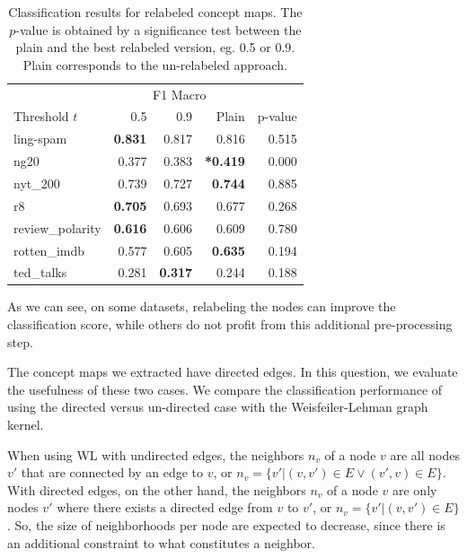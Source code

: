 \begin{table}[htb!]
	\centering
	\begin{tabular}{lrrrr}
		{} & \multicolumn{3}{c}{F1 Macro} &  \\
		Threshold $t$ &         0.5 &   0.9 & Plain & p-value \\
		\midrule
		ling-spam       & \textbf{0.831} & 0.817 & 0.816 & 0.515 \\
		ng20            & 0.377 & 0.383 & \textbf{*0.419} & 0.000 \\
		nyt\_200         & 0.739 & 0.727 & \textbf{0.744} & 0.885 \\
		r8              & \textbf{0.705} & 0.693 & 0.677 & 0.268 \\
		review\_polarity & \textbf{0.616} & 0.606 & 0.609 & 0.780 \\
		rotten\_imdb     & 0.577 & 0.605 & \textbf{0.635} & 0.194 \\
		ted\_talks       & 0.281 & \textbf{0.317} & 0.244 & 0.188 \\
		\bottomrule
	\end{tabular}
	\caption[Results: Merge infrequent nodes]{Classification results for relabeled concept maps. The $p$-value is obtained by a significance test between the plain and the best relabeled version, eg. 0.5 or 0.9. Plain corresponds to the un-relabeled approach.	}
	\label{table:results_infrequent_relabeled}
\end{table}

As we can see, on some datasets, relabeling the nodes can improve the classification score, while others do not profit from this additional pre-processing step.


The concept maps we extracted have directed edges.
In this question, we evaluate the usefulness of these two cases.
We compare the classification performance of using the directed versus un-directed case with the Weisfeiler-Lehman graph kernel.

When using WL with undirected edges, the neighbors $n_v$ of a node $v$ are all nodes $v'$ that are connected by an edge to $v$, or $n_v = \{v' | (v, v') \in E \lor (v', v ) \in E \}$.
With directed edges, on the other hand, the neighbors $n_v$ of a node $v$ are only nodes $v'$ where there exists a directed edge from $v$ to $v'$, or $n_v = \{v' | (v, v') \in E \}$.
So, the size of neighborhoods per node are expected to decrease, since there is an additional constraint to what constitutes a neighbor.

